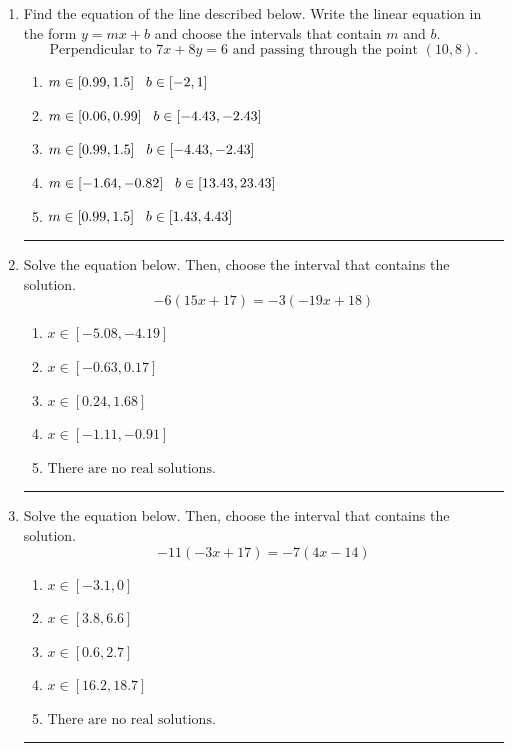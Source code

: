 \documentclass[14pt]{extbook}
\newcommand{\litem}[1]{\item#1\hspace*{-1cm}\rule{\textwidth}{0.4pt}}
\begin{document}
\begin{enumerate}
{\begin{enumerate}[label=\Alph*.]
\end{enumerate} }
\litem{
Find the equation of the line described below. Write the linear equation in the form $ y=mx+b $ and choose the intervals that contain $m$ and $b$.\[ \text{Perpendicular to } 7 x + 8 y = 6 \text{ and passing through the point } (10, 8). \]\begin{enumerate}[label=\Alph*.]
\item \( m \in [0.99, 1.5] \hspace*{3mm} b \in [-2, 1] \)
\item \( m \in [0.06, 0.99] \hspace*{3mm} b \in [-4.43, -2.43] \)
\item \( m \in [0.99, 1.5] \hspace*{3mm} b \in [-4.43, -2.43] \)
\item \( m \in [-1.64, -0.82] \hspace*{3mm} b \in [13.43, 23.43] \)
\item \( m \in [0.99, 1.5] \hspace*{3mm} b \in [1.43, 4.43] \)

\end{enumerate} }
\litem{
Solve the equation below. Then, choose the interval that contains the solution.\[ -6(15x + 17) = -3(-19x + 18) \]\begin{enumerate}[label=\Alph*.]
\item \( x \in [-5.08, -4.19] \)
\item \( x \in [-0.63, 0.17] \)
\item \( x \in [0.24, 1.68] \)
\item \( x \in [-1.11, -0.91] \)
\item \( \text{There are no real solutions.} \)

\end{enumerate} }
\litem{
Solve the equation below. Then, choose the interval that contains the solution.\[ -11(-3x + 17) = -7(4x -14) \]\begin{enumerate}[label=\Alph*.]
\item \( x \in [-3.1, 0] \)
\item \( x \in [3.8, 6.6] \)
\item \( x \in [0.6, 2.7] \)
\item \( x \in [16.2, 18.7] \)
\item \( \text{There are no real solutions.} \)


\end{enumerate}}
\end{enumerate}
\end{document}
